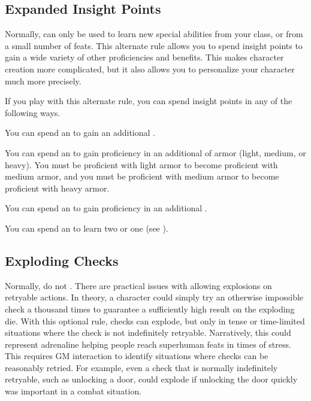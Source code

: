   \subsection{Expanded Insight Points}
    Normally,  can only be used to learn new special abilities from your class, or from a small number of feats.
    This alternate rule allows you to spend insight points to gain a wide variety of other proficiencies and benefits.
    This makes character creation more complicated, but it also allows you to personalize your character much more precisely.

    If you play with this alternate rule, you can spend insight points in any of the following ways.
    \begin{raggeditemize}
      \item You can spend an  to gain an additional .
      \item You can spend an  to gain proficiency in an additional  of armor (light, medium, or heavy).
        You must be proficient with light armor to become proficient with medium armor, and you must be proficient with medium armor to become proficient with heavy armor.
      \item You can spend an  to gain proficiency in an additional .
      \item You can spend an  to learn two  or one  (see ).
    \end{raggeditemize}

  \subsection{Exploding Checks}
    Normally,  do not .
    There are practical issues with allowing explosions on retryable actions.
    In theory, a character could simply try an otherwise impossible check a thousand times to guarantee a sufficiently high result on the exploding die.
    With this optional rule, checks can explode, but only in tense or time-limited situations where the check is not indefinitely retryable.
    Narratively, this could represent adrenaline helping people reach superhuman feats in times of stress.
    This requires GM interaction to identify situations where checks can be reasonably retried.
    For example, even a check that is normally indefinitely retryable, such as unlocking a door, could explode if unlocking the door quickly was important in a combat situation.

